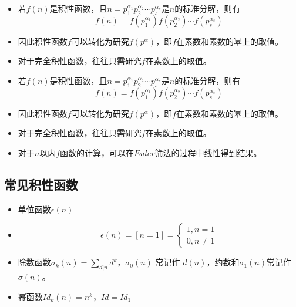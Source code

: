 \documentclass{beamer}
\begin{document}
\begin{frame}
\begin{itemize}[<+-| alert@+>]
	\item 若$f(n)$是积性函数，且$n=p_{1}^{\alpha_1}p_{2}^{\alpha_2} \cdots p_{s}^{\alpha_s}$是$n$的标准分解，则有$$f(n)=f(p_{1}^{\alpha_1})f(p_{2}^{\alpha_2}) \cdots f(p_{s}^{\alpha_s})$$
	\item 因此积性函数$f$可以转化为研究$f(p^\alpha)$，即$f$在素数和素数的幂上的取值。
	\item 对于完全积性函数，往往只需研究$f$在素数上的取值。
\end{itemize}
\end{frame}

\begin{frame}
\begin{itemize}[<+-| alert@+>]
	\item 若$f(n)$是积性函数，且$n=p_{1}^{\alpha_1}p_{2}^{\alpha_2} \cdots p_{s}^{\alpha_s}$是$n$的标准分解，则有$$f(n)=f(p_{1}^{\alpha_1})f(p_{2}^{\alpha_2}) \cdots f(p_{s}^{\alpha_s})$$
	\item 因此积性函数$f$可以转化为研究$f(p^\alpha)$，即$f$在素数和素数的幂上的取值。
	\item 对于完全积性函数，往往只需研究$f$在素数上的取值。
	\item 对于$n$以内$f$函数的计算，可以在$Euler$筛法的过程中线性得到结果。
\end{itemize}
\end{frame}

\subsection{常见积性函数}

\begin{frame}
\begin{itemize}[<+-| alert@+>]
	\item 单位函数$\epsilon(n)$
	\item $$\epsilon(n)=[n=1]=
			\begin{cases}
			1,n=1\\
			0,n \neq 1
			\end{cases}$$
	\item 除数函数$\sigma_{k}(n)=\sum_{d|n}d^{k}$，$\sigma_{0}(n)$ 常记作 $d(n)$，约数和$\sigma_{1}(n)$常记作$\sigma(n)$。
	\item 幂函数$Id_{k}(n)=n^{k}$，$Id=Id_{1}$
\end{itemize}
\end{frame}
\end{document}
